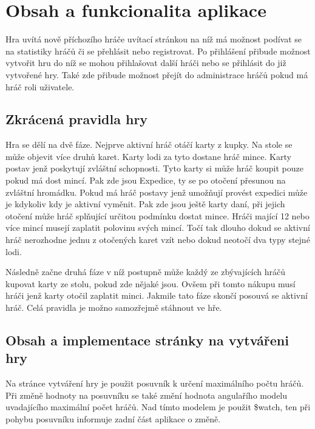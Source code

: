 \documentclass[czech,master,public,dept460,male,cpdeclaration,twoside]{diploma}
\begin{document}
\section{Obsah a funkcionalita aplikace}
Hra uvítá nově příchozího hráče uvítací stránkou na níž má možnost podívat se na statistiky hráčů či se přehlásit nebo registrovat. Po přihlášení přibude možnost vytvořit hru do níž se mohou přihlašovat další hráči nebo se přihlásit do již vytvořené hry. Také zde přibude možnost přejít do administrace hráčů pokud má hráč roli uživatele.

\subsection{Zkrácená pravidla hry}
Hra se dělí na dvě fáze. Nejprve aktivní hráč otáčí karty z kupky. Na stole se může objevit více druhů karet. Karty lodi za tyto dostane hráč mince. Karty postav jenž poskytují zvláštní schopnosti.  Tyto karty si může hráč koupit pouze pokud má dost mincí. Pak zde jsou Expedice, ty se po otočení přesunou na zvláštní hromádku. Pokud má hráč postavy jenž umožňují provést expedici může je kdykoliv kdy je aktivní vyměnit. Pak zde jsou ještě karty daní, při jejich otočení může hráč splňující určitou podmínku dostat mince. Hráči mající 12 nebo více mincí musejí zaplatit polovinu svých mincí. Točí tak dlouho dokud se aktivní hráč nerozhodne jednu z otočených karet vzít nebo dokud neotočí dva typy stejné lodi.

Následně začne druhá fáze v níž postupně může každý ze zbývajících hráčů kupovat karty ze stolu, pokud zde nějaké jsou. Ovšem při tomto nákupu musí hráči jenž karty otočil zaplatit minci. Jakmile tato fáze skončí posouvá se aktivní hráč. Celá pravidla je možno samozřejmě stáhnout ve hře.

\subsection{Obsah a implementace stránky na vytvářeni hry}
Na stránce vytváření hry je použit posuvník k určení maximálního počtu hráčů. Při změně hodnoty na posuvníku se také změní hodnota angulařího modelu uvadajícího maximální počet hráčů. Nad tímto modelem je použit \$watch, ten při pohybu posuvníku informuje zadní část aplikace o změně.
\end{document}
